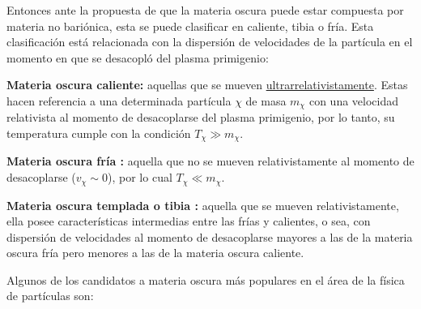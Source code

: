 Entonces ante la propuesta de que la materia oscura puede estar compuesta por materia no bariónica, esta se puede clasificar en caliente, tibia o fría. Esta clasificación está relacionada con la dispersión de velocidades de la partícula en el momento en que se desacopló del plasma primigenio:
\begin{itemize_f}
\item \textbf{Materia oscura caliente: } aquellas que se mueven \href{https://en.wikipedia.org/wiki/Ultrarelativistic_limit}{ultrarrelativistamente}. Estas hacen referencia a una determinada partícula $\chi$ de masa $m_\chi$ con una velocidad relativista al momento de desacoplarse del plasma primigenio, por lo tanto, su temperatura cumple con la condición $T_\chi \gg m_\chi$. 

\item \textbf{Materia oscura fría :} aquella que no se mueven relativistamente al momento de desacoplarse ($v_\chi \sim 0$), por lo cual $T_\chi \ll m_\chi$. 

\item \textbf{Materia oscura templada o tibia :} aquella que se mueven relativistamente, ella posee características intermedias entre las frías y calientes, o sea, con dispersión de velocidades al momento de desacoplarse mayores a las de la materia oscura fría pero menores a las de la materia oscura caliente.
\end{itemize_f}

Algunos de los candidatos a materia oscura más populares en el área de la física de partículas son: 

